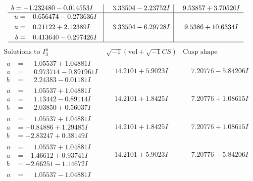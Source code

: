 \documentclass[1p]{elsarticle_modified}
\theoremstyle{definition}
\newcommand{\I}{\sqrt{-1}}
\begin{document}
$$\begin{array}{c|c|c}
\begin{aligned}
b &= -1.232480 - 0.014553 I\end{aligned}
 & \phantom{-}3.33504 - 2.23752 I & \phantom{-}9.53857 + 3.70520 I \\ \hline\begin{aligned}
u &= \phantom{-}0.656474 - 0.273636 I \\
a &= \phantom{-}0.21122 + 2.12389 I \\
b &= \phantom{-}0.413640 - 0.297426 I\end{aligned}
 & \phantom{-}3.33504 - 6.29728 I & \phantom{-}9.5386 + 10.6334 I\\
 \hline 
 \end{array}$$\newpage$$\begin{array}{c|c|c}  
\text{Solutions to }I^u_{3}& \I (\text{vol} + \sqrt{-1}CS) & \text{Cusp shape}\\
 \hline 
\begin{aligned}
u &= \phantom{-}1.05537 + 1.04881 I \\
a &= \phantom{-}0.973714 - 0.891961 I \\
b &= \phantom{-}2.24383 - 0.01181 I\end{aligned}
 & \phantom{-}14.2101 + 5.9023 I & \phantom{-}7.20776 - 5.84206 I \\ \hline\begin{aligned}
u &= \phantom{-}1.05537 + 1.04881 I \\
a &= \phantom{-}1.13442 - 0.89114 I \\
b &= \phantom{-}2.03850 + 0.56037 I\end{aligned}
 & \phantom{-}14.2101 + 1.8425 I & \phantom{-}7.20776 + 1.08615 I \\ \hline\begin{aligned}
u &= \phantom{-}1.05537 + 1.04881 I \\
a &= -0.84886 + 1.29485 I \\
b &= -2.83247 + 0.38149 I\end{aligned}
 & \phantom{-}14.2101 + 1.8425 I & \phantom{-}7.20776 + 1.08615 I \\ \hline\begin{aligned}
u &= \phantom{-}1.05537 + 1.04881 I \\
a &= -1.46612 + 0.93741 I \\
b &= -2.66251 - 1.14672 I\end{aligned}
 & \phantom{-}14.2101 + 5.9023 I & \phantom{-}7.20776 - 5.84206 I \\ \hline\begin{aligned}
u &= \phantom{-}1.05537 - 1.04881 I \\

\end{aligned}
\end{array}$$
\end{document}
